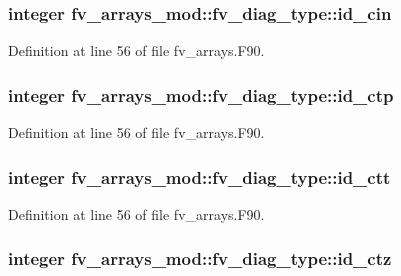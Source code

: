\subsubsection[{id\-\_\-cin}]{\setlength{\rightskip}{0pt plus 5cm}integer fv\-\_\-arrays\-\_\-mod\-::fv\-\_\-diag\-\_\-type\-::id\-\_\-cin}\label{structfv__arrays__mod_1_1fv__diag__type_a74dccd47d733f0707c22cf3241c6b644}


Definition at line 56 of file fv\-\_\-arrays.\-F90.

\subsubsection[{id\-\_\-ctp}]{\setlength{\rightskip}{0pt plus 5cm}integer fv\-\_\-arrays\-\_\-mod\-::fv\-\_\-diag\-\_\-type\-::id\-\_\-ctp}\label{structfv__arrays__mod_1_1fv__diag__type_a8be83990bad9c08d0ee22c4a715c0fee}


Definition at line 56 of file fv\-\_\-arrays.\-F90.

\subsubsection[{id\-\_\-ctt}]{\setlength{\rightskip}{0pt plus 5cm}integer fv\-\_\-arrays\-\_\-mod\-::fv\-\_\-diag\-\_\-type\-::id\-\_\-ctt}\label{structfv__arrays__mod_1_1fv__diag__type_af6a039f9407545cd5d19e26bcb400848}


Definition at line 56 of file fv\-\_\-arrays.\-F90.

\subsubsection[{id\-\_\-ctz}]{\setlength{\rightskip}{0pt plus 5cm}integer fv\-\_\-arrays\-\_\-mod\-::fv\-\_\-diag\-\_\-type\-::id\-\_\-ctz}\label{structfv__arrays__mod_1_1fv__diag__type_a45c733e24768dd170244eb3f1ff2339f}


